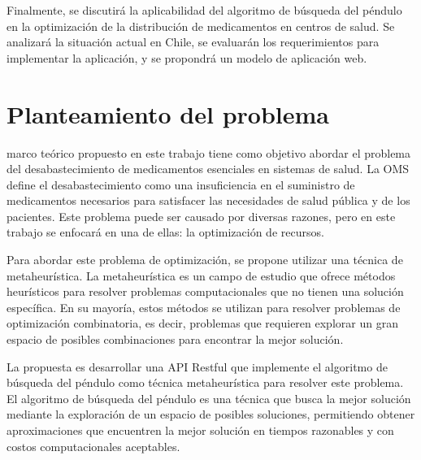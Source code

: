 \documentclass{ieeeaccess}
\begin{document}
Finalmente, se discutirá la aplicabilidad del algoritmo de búsqueda del péndulo en la optimización de la distribución de medicamentos en centros de salud. Se analizará la situación actual en Chile, se evaluarán los requerimientos para implementar la aplicación, y se propondrá un modelo de aplicación web.

\section{Planteamiento del problema}
\label{sec:ProblemStatement}
 marco teórico propuesto en este trabajo tiene como objetivo abordar el problema del desabastecimiento de medicamentos esenciales en sistemas de salud. La OMS define el desabastecimiento como una insuficiencia en el suministro de medicamentos necesarios para satisfacer las necesidades de salud pública y de los pacientes. Este problema puede ser causado por diversas razones, pero en este trabajo se enfocará en una de ellas: la optimización de recursos.

Para abordar este problema de optimización, se propone utilizar una técnica de metaheurística. La metaheurística es un campo de estudio que ofrece métodos heurísticos para resolver problemas computacionales que no tienen una solución específica. En su mayoría, estos métodos se utilizan para resolver problemas de optimización combinatoria, es decir, problemas que requieren explorar un gran espacio de posibles combinaciones para encontrar la mejor solución.

La propuesta es desarrollar una API Restful que implemente el algoritmo de búsqueda del péndulo como técnica metaheurística para resolver este problema. El algoritmo de búsqueda del péndulo es una técnica que busca la mejor solución mediante la exploración de un espacio de posibles soluciones, permitiendo obtener aproximaciones que encuentren la mejor solución en tiempos razonables y con costos computacionales aceptables.

\EOD
\end{document}
